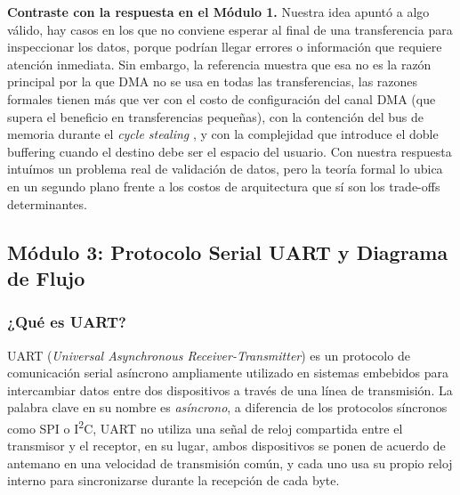 \documentclass[12pt,letterpaper]{article}
\begin{document}
\textbf{Contraste con la respuesta en el Módulo 1.}
Nuestra idea apuntó a algo válido, hay casos en los que no conviene esperar al final de una transferencia para
inspeccionar los datos, porque podrían llegar errores o información que requiere atención inmediata.
Sin embargo, la referencia muestra que esa no es la razón principal por la que DMA no se usa en todas las
transferencias, las razones formales tienen más que ver con el costo de configuración del canal DMA (que supera
el beneficio en transferencias pequeñas), con la contención del bus de memoria durante el \textit{cycle stealing}
, y con la complejidad que introduce el doble buffering cuando el destino debe ser el espacio del usuario.
Con nuestra respuesta intuímos un problema real de validación de datos, pero la teoría formal lo ubica en un
segundo plano frente a los costos de arquitectura que sí son los trade-offs determinantes.

\newpage

\subsection*{Módulo 3: Protocolo Serial UART y Diagrama de Flujo}

\subsubsection*{¿Qué es UART?}

UART (\textit{Universal Asynchronous Receiver-Transmitter}) es un protocolo de comunicación serial asíncrono
ampliamente utilizado en sistemas embebidos para intercambiar datos entre dos dispositivos a través de una línea
de transmisión. La palabra clave en su nombre es \textit{asíncrono}, a diferencia de los protocolos síncronos
como SPI o I\textsuperscript{2}C, UART no utiliza una señal de reloj compartida entre el transmisor y el
receptor, en su lugar, ambos dispositivos se ponen de acuerdo de antemano en una velocidad de transmisión
común, y cada uno usa su propio reloj interno para sincronizarse durante la recepción de cada byte.
\end{document}
